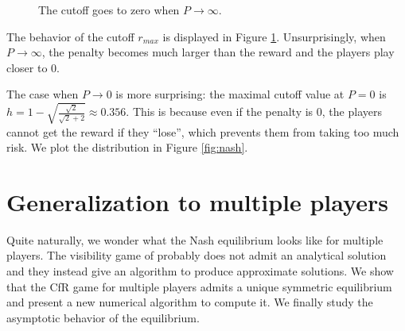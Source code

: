 \documentclass[preprint,12pt,authoryear]{elsarticle}
\theoremstyle{definition}
\begin{document}
\begin{figure}[htbp]
  \centering
  
  \caption{The cutoff goes to zero when $P \rightarrow\infty$.}
  \label{fig:cutoff}  
\end{figure}


 The behavior of the cutoff ${r_{max}}$ is displayed in Figure \ref{fig:cutoff}. Unsurprisingly, when $P \rightarrow \infty$, the penalty becomes much larger than the reward and the players play closer to $0$.

The case when $P \rightarrow 0$ is more surprising: the maximal cutoff value at $P=0$ is $h = 1 - \sqrt{\frac{\sqrt{2}}{\sqrt{2} + 2}} \approx 0.356$. This is because even if the penalty is $0$, the players cannot get the reward if they ``lose'', which prevents them from taking too much risk. We plot the distribution in Figure \ref{fig:nash}. 

\section{Generalization to multiple players}

Quite naturally, we wonder what the Nash equilibrium looks like for multiple players. The visibility game of \citet{Lotker2008-tx} probably does not admit an analytical solution and they instead give an algorithm to produce approximate solutions. We show that the CfR game for multiple players admits a unique symmetric equilibrium and present a new numerical algorithm to compute it. We finally study the asymptotic behavior of the equilibrium. 
\end{document}
